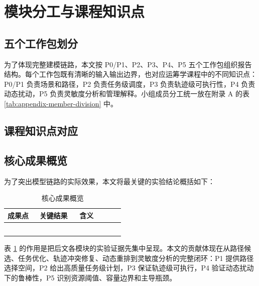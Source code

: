 \documentclass[12pt,a4paper,UTF8]{ctexart}
\begin{document}
\section{模块分工与课程知识点}

\subsection{五个工作包划分}

为了体现完整建模链路，本文按 P0/P1、P2、P3、P4、P5 五个工作包组织报告结构。每个工作包既有清晰的输入输出边界，也对应运筹学课程中的不同知识点：P0/P1 负责场景和路径，P2 负责任务级调度，P3 负责轨迹级可执行性，P4 负责动态扰动，P5 负责灵敏度分析和管理解释。小组成员分工统一放在附录 A 的表 \ref{tab:appendix-member-division} 中。

\subsection{课程知识点对应}







\subsection{核心成果概览}

为了突出模型链路的实际效果，本文将最关键的实验结论概括如下：

\begin{table}[H]
\centering
\small
\begin{tabular}{p{0.24\linewidth}p{0.30\linewidth}p{0.34\linewidth}}
\toprule
成果点 & 关键结果 & 含义 \\
\midrule
\\
\\
\\
\\
\\
\bottomrule
\end{tabular}
\caption{核心成果概览}
\label{tab:core-results}
\end{table}

表 \ref{tab:core-results} 的作用是把后文各模块的实验证据先集中呈现。本文的贡献体现在从路径候选、任务优化、轨迹冲突修复、动态重排到灵敏度分析的完整闭环：P1 提供路径选择空间，P2 给出高质量任务级计划，P3 保证轨迹级可执行，P4 验证动态扰动下的鲁棒性，P5 识别资源阈值、容量边界和主导瓶颈。
\end{document}
